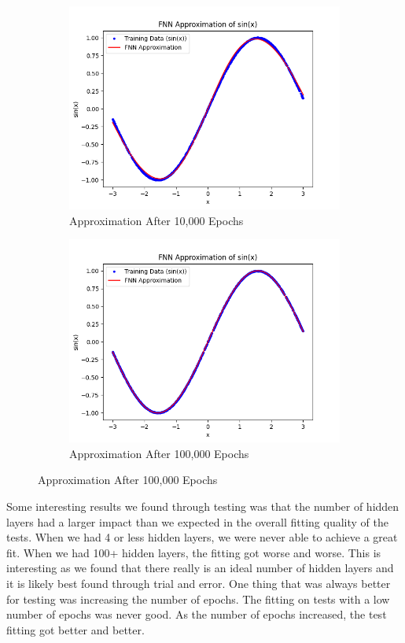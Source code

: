 \documentclass{article}
\begin{document}
\begin{figure}[h!]
    \begin{subfigure}{0.45\textwidth}
        \centering
        \includegraphics[width=\linewidth]{figs/FNN_Test03.png}
        \caption{Approximation After 10,000 Epochs}
        \label{fig:10000epochs}
    \end{subfigure}
    \hfill
    \begin{subfigure}{0.45\textwidth}
        \centering
        \includegraphics[width=\linewidth]{figs/FNN_Test04.png}
        \caption*{Approximation After 100,000 Epochs}
        \label{fig:finalapproximation}
    \end{subfigure}
    \label{fig:sin_approximation}
\end{figure}
Some interesting results we found through testing was that the number of hidden layers had a larger impact than we expected in the overall fitting quality of the tests. When we had 4 or less hidden layers, we were never able to achieve a great fit. When we had 100+ hidden layers, the fitting got worse and worse. This is interesting as we found that there really is an ideal number of hidden layers and it is likely best found through trial and error. One thing that was always better for testing was increasing the number of epochs. The fitting on tests with a low number of epochs was never good. As the number of epochs increased, the test fitting got better and better.
\end{document}

